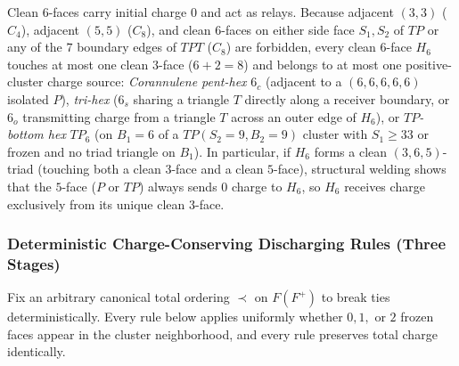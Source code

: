 \documentclass[11pt,reqno]{amsart}
\theoremstyle{plain}
\theoremstyle{definition}
\theoremstyle{remark}
\DeclareRobustCommand{\_}{\ifmmode\text{\textunderscore}\else\textunderscore\allowbreak\fi}
\begin{document}
Clean $6$-faces carry initial charge $0$ and act as relays. Because adjacent $(3,3)$ ($C_4$), adjacent $(5,5)$ ($C_8$), and clean $6$-faces on either side face $S_1, S_2$ of $TP$ or any of the $7$ boundary edges of $TPT$ ($C_8$) are forbidden, every clean $6$-face $H_6$ touches at most one clean $3$-face ($6 + 2 = 8$) and belongs to at most one positive-cluster charge source: \emph{Corannulene pent-hex} $6_c$ (adjacent to a $(6,6,6,6,6)$ isolated $P$), \emph{tri-hex} ($6_s$ sharing a triangle $T$ directly along a receiver boundary, or $6_o$ transmitting charge from a triangle $T$ across an outer edge of $H_6$), or \emph{$TP$-bottom hex} $TP_6$ (on $B_1 = 6$ of a $TP(S_2=9, B_2=9)$ cluster with $S_1 \ge 33$ or frozen and no triad triangle on $B_1$). In particular, if $H_6$ forms a clean $(3,6,5)$-triad (touching both a clean $3$-face and a clean $5$-face), structural welding shows that the $5$-face ($P$ or $TP$) always sends $0$ charge to $H_6$, so $H_6$ receives charge exclusively from its unique clean $3$-face.

\subsubsection*{Deterministic Charge-Conserving Discharging Rules (Three Stages)}
Fix an arbitrary canonical total ordering $\prec$ on $F(F^+)$ to break ties deterministically. Every rule below applies uniformly whether $0, 1,$ or $2$ frozen faces appear in the cluster neighborhood, and every rule preserves total charge identically.
\end{document}
